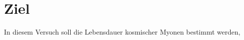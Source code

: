 \section{Ziel}
\label{sec:Ziel}

In diesem Versuch soll die Lebensdauer kosmischer Myonen bestimmt werden, 